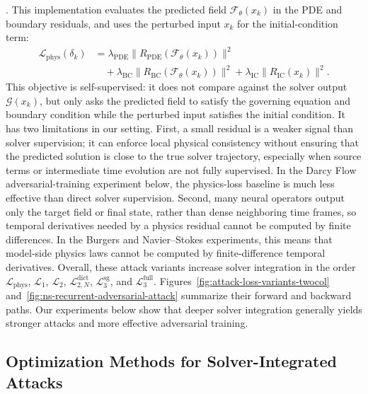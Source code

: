 \documentclass[letterpaper]{article} %
\newcommand{\figrefs}[2]{Figures~\ref{#1} and~\ref{#2}}
\begin{document}
\citep{shi2025wbar,huang2026stablepdenet,ouyang2025rams}. This implementation
evaluates the predicted field $\mathcal{F}_\theta(x_k)$ in the PDE and boundary
residuals, and uses the perturbed input $x_k$ for the initial-condition term:
\begin{align}
  \mathcal{L}_{\mathrm{phys}}(\delta_k)
  &=
  \lambda_{\mathrm{PDE}}
  \|R_{\mathrm{PDE}}(\mathcal{F}_\theta(x_k))\|^2
  \nonumber\\
  &\quad+
  \lambda_{\mathrm{BC}}
  \|R_{\mathrm{BC}}(\mathcal{F}_\theta(x_k))\|^2
  +
  \lambda_{\mathrm{IC}}
  \|R_{\mathrm{IC}}(x_k)\|^2 .
\end{align}
This objective is self-supervised: it does not compare against the solver output
$\mathcal{G}(x_k)$, but only asks the predicted field to satisfy the governing
equation and boundary condition while the perturbed input satisfies the initial
condition. It has two limitations in our setting. First, a small residual is a
weaker signal than solver supervision; it can enforce local physical consistency
without ensuring that the predicted solution is close to the true solver
trajectory, especially when source terms or intermediate time evolution are not
fully supervised. In the Darcy Flow adversarial-training experiment below, the
physics-loss baseline is much less effective than direct solver supervision.
Second, many neural operators output only the target field or final state,
rather than dense neighboring time frames, so temporal derivatives needed by a
physics residual cannot be computed by finite differences. In the Burgers and
Navier--Stokes experiments, this means that model-side physics laws cannot be
computed by finite-difference temporal derivatives.
Overall, these attack variants increase solver integration in the order
$\mathcal{L}_{\mathrm{phys}}$, $\mathcal{L}_1$, $\mathcal{L}_2$,
$\mathcal{L}_{2,N}^{\mathrm{dict}}$, $\mathcal{L}_3^{\mathrm{sg}}$, and
$\mathcal{L}_3^{\mathrm{full}}$.
\figrefs{fig:attack-loss-variants-twocol}{fig:ns-recurrent-adversarial-attack}
summarize their forward and
backward paths. Our experiments below show that deeper solver integration
generally yields stronger attacks and more effective adversarial training.

\subsection{Optimization Methods for Solver-Integrated Attacks}
\end{document}
